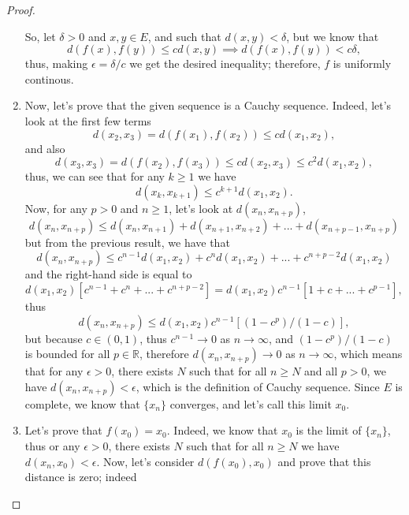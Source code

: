 \documentclass[11pt]{article}
\newtheorem{proof}{Proof}
\begin{document}
\begin{proof}
\begin{enumerate}
	So, let $\delta>0$ and $x,y\in E$, and such that $d(x,y)<\delta$, but we know that
\begin{displaymath}
  d(f(x),f(y))\leq cd(x,y)\implies d(f(x),f(y)) < c\delta,
\end{displaymath}
thus, making $\epsilon = \delta / c$ we get the desired inequality; therefore, $f$ is uniformly continous.
\item Now, let's prove that the given sequence is a Cauchy sequence. Indeed, let's look at the first few terms 
\begin{displaymath}
  d(x_2,x_3) = d(f(x_1),f(x_2))\leq cd(x_1,x_2),
\end{displaymath}
and also 
\begin{displaymath}
  d(x_3,x_3) = d(f(x_2),f(x_3))\leq cd(x_2,x_3)\leq c^2d(x_1,x_2),
\end{displaymath}
thus, we can see that for any $k\geq 1$ we have
\begin{displaymath}
  d(x_k,x_{k+1})\leq c^{k+1}d(x_1,x_2).
\end{displaymath}
Now, for any $p>0$ and $n\geq 1$, let's look at $d(x_n, x_{n+p})$,
\begin{displaymath}
d(x_n, x_{n+p}) \leq d(x_n, x_{n+1}) + d(x_{n+1}, x_{n+2}) + ... + d(x_{n+p-1}, x_{n+p})
\end{displaymath}
but from the previous result, we have that
\begin{displaymath}
  d(x_n, x_{n+p}) \leq  c^{n-1}d(x_1, x_2) + c^nd(x_1, x_2) + ... + c^{n+p-2}d(x_1, x_2)
\end{displaymath}
and the right-hand side is equal to 
\begin{displaymath}
  d(x_1, x_2)[c^{n-1} + c^n + ... + c^{n+p-2}]=d(x_1, x_2)c^{n-1}[1 + c + ... + c^{p-1}],
\end{displaymath}
thus 
\begin{displaymath}
  d(x_n, x_{n+p}) \leq d(x_1, x_2)c^{n-1}[(1-c^p)/(1-c)],
\end{displaymath}
but because $c\in(0,1)$, thus $c^{n-1}\rightarrow 0$ as $n\rightarrow\infty$, and $(1-c^p)/(1-c)$ is bounded for all $p\in \mathbb{R}$, therefore $d(x_n, x_{n+p})\rightarrow 0$ as $n\rightarrow\infty$, which means that for any $ \epsilon> 0$, there exists $N$ such that for all $n\geq N$ and all $p > 0$, we have $d(x_n, x_{n+p}) < \epsilon$, which is the definition of Cauchy sequence. Since $E$ is complete, we know that $\{x_n\}$ converges, and let's call this limit $x_0$.
\item Let's prove that $f(x_0)=x_0$. Indeed, we know that $x_0$ is the limit of $\{x_n\}$, thus or any $\epsilon > 0$, there exists $N$ such that for all $n \geq N$ we have $d(x_n, x_0) < \epsilon$. Now, let's consider $d(f(x_0), x_0)$ and prove that this distance is zero; indeed

\end{enumerate}
\end{proof}
\end{document}
